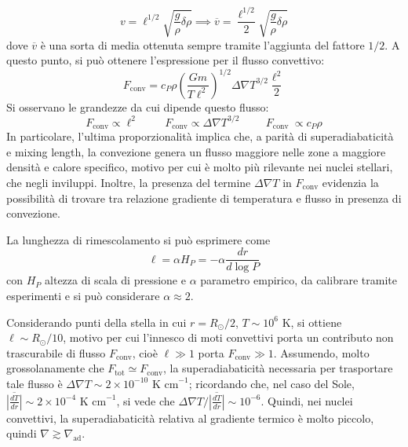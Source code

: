 \documentclass[11pt, a4paper]{scrartcl}
\theoremstyle{style}
\theoremstyle{style1}
\numberwithin{equation}{subsection}
\begin{document}
\begin{equation}\label{vconv}
v = \ell ^{1 / 2} \sqrt{\frac{g}{\rho }\delta \rho  }  \implies \overline{v} = \frac{\ell ^{1/2}}{2} \sqrt{\frac{g}{\rho }\delta \rho } 
\end{equation}
dove $\overline{v}$ \`e una sorta di media ottenuta sempre tramite l'aggiunta del fattore $1 / 2$.
A questo punto, si pu\`o ottenere l'espressione per il flusso convettivo:
\begin{equation}
	F_\text{conv} = c_P \rho  \left(\frac{Gm}{T\ell ^{2}}\right) ^{ 1 / 2} \Delta \nabla T ^{3/2} \frac{\ell ^2}{2}
\end{equation}
Si osservano le grandezze da cui dipende questo flusso:
\[
F_\text{conv} \propto \ell ^2 \hspace{1cm} F_\text{conv} \propto \Delta \nabla T ^{3 /2} \hspace{1cm} F_\text{conv } \propto c_P \rho 
\] 
In particolare, l'ultima proporzionalit\`a implica che, a parit\`a di superadiabaticit\`a e mixing length, la convezione genera un flusso maggiore nelle zone a maggiore densit\`a e calore specifico, motivo per cui \`e molto pi\`u rilevante nei nuclei stellari, che negli inviluppi.
Inoltre, la presenza del termine $\Delta \nabla T$ in $F_\text{conv}$ evidenzia la possibilit\`a di trovare tra relazione gradiente di temperatura e flusso in presenza di convezione.

La lunghezza di rimescolamento si pu\`o esprimere come
\[
\ell  = \alpha  H_P = -\alpha \frac{d r}{d \log P} 
\] 
con $H_P$ altezza di scala di pressione e $\alpha $ parametro empirico, da calibrare tramite esperimenti e si pu\`o considerare $\alpha \approx 2$.

Considerando punti della stella in cui $r = R_\odot / 2$, $T\sim 10^6$ K, si ottiene $\ell \sim R_\odot  / 10$, motivo per cui l'innesco di moti convettivi porta un contributo non trascurabile di flusso $F_\text{conv}$, cio\`e $\ell \gg 1$ porta $F_\text{conv} \gg 1$.
Assumendo, molto grossolanamente che $F_\text{tot} \simeq F_\text{conv}$, la superadiabaticit\`a necessaria per trasportare tale flusso \`e $\Delta \nabla T \sim 2 \times 10^{-10} \text{ K cm}^{-1}$; ricordando che, nel caso del Sole, $\overline{\left\lvert \frac{d T}{d r}  \right\rvert }\sim 2\times 10^{-4} \text{ K cm}^{-1}$, si vede che $\Delta \nabla T / \overline{\left\lvert \frac{d T}{d r}  \right\rvert } \sim 10^{-6}$.
Quindi, nei nuclei convettivi, la superadiabaticit\`a relativa al gradiente termico \`e molto piccolo, quindi $\nabla \gtrsim \nabla _\text{ad}$.
\end{document}
